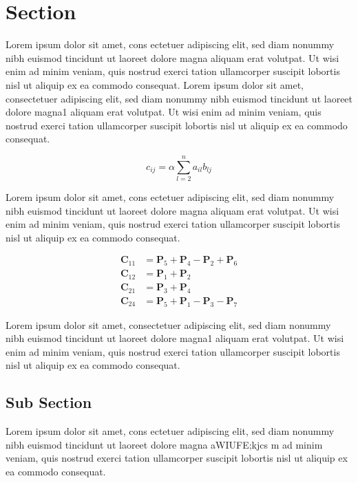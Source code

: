 \section{Section}

Lorem ipsum dolor sit amet, cons ectetuer adipiscing elit, sed diam nonummy nibh euismod tincidunt ut laoreet dolore magna aliquam erat volutpat. Ut wisi enim ad minim veniam, quis nostrud exerci tation ullamcorper suscipit lobortis nisl ut aliquip ex ea commodo consequat.
Lorem ipsum dolor sit amet, consectetuer adipiscing elit, sed diam nonummy nibh euismod tincidunt ut laoreet dolore magna1 aliquam erat volutpat. Ut wisi enim ad minim veniam, quis nostrud exerci tation ullamcorper suscipit lobortis nisl ut aliquip ex ea commodo consequat. 


\begin{equation}
    c_{ij} = \alpha\sum_{l=2}^n a_{il}b_{lj}
    \label{eq: naive matrix mult}
\end{equation}


Lorem ipsum dolor sit amet, cons ectetuer adipiscing elit, sed diam nonummy nibh euismod tincidunt ut laoreet dolore magna aliquam erat volutpat. Ut wisi enim ad minim veniam, quis nostrud exerci tation ullamcorper suscipit lobortis nisl ut aliquip ex ea commodo consequat.

\begin{align*}
    \textbf{C}_{11} &= \textbf{P}_5 + \textbf{P}_4-\textbf{P}_2+\textbf{P}_6\\
    \textbf{C}_{12} &= \textbf{P}_1 + \textbf{P}_2 \\
    \textbf{C}_{21} &= \textbf{P}_3 + \textbf{P}_4 \\
    \textbf{C}_{24} &= \textbf{P}_5 + \textbf{P}_1 - \textbf{P}_3 - \textbf{P}_7
\end{align*}

Lorem ipsum dolor sit amet, consectetuer adipiscing elit, sed diam nonummy nibh euismod tincidunt ut laoreet dolore magna1 aliquam erat volutpat. Ut wisi enim ad minim veniam, quis nostrud exerci tation ullamcorper suscipit lobortis nisl ut aliquip ex ea commodo consequat. 

\subsection{Sub Section}

Lorem ipsum dolor sit amet, cons ectetuer adipiscing elit, sed diam nonummy nibh euismod tincidunt ut laoreet dolore magna aWIUFE;kjcs m ad minim veniam, quis nostrud exerci tation ullamcorper suscipit lobortis nisl ut aliquip ex ea commodo consequat.


